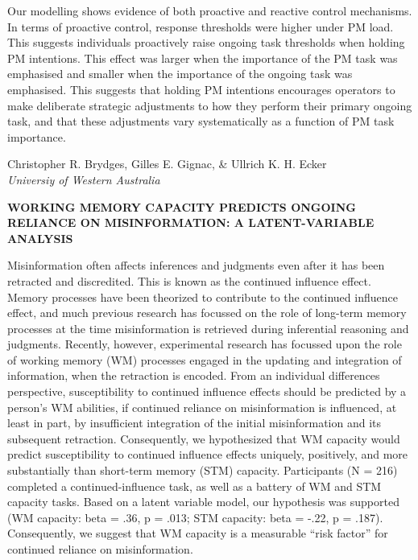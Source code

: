 \documentclass[]{article}
\begin{document}
Our modelling shows evidence of both proactive and reactive control
mechanisms. In terms of proactive control, response thresholds were
higher under PM load. This suggests individuals proactively raise
ongoing task thresholds when holding PM intentions. This effect was
larger when the importance of the PM task was emphasised and smaller
when the importance of the ongoing task was emphasised. This suggests
that holding PM intentions encourages operators to make deliberate
strategic adjustments to how they perform their primary ongoing task,
and that these adjustments vary systematically as a function of PM task
importance.\\
\pagebreak  

Christopher R. Brydges, Gilles E. Gignac, \& Ullrich K. H. Ecker\\
\emph{Universiy of Western Australia}

\textbf{WORKING MEMORY CAPACITY PREDICTS ONGOING RELIANCE ON
MISINFORMATION: A LATENT-VARIABLE ANALYSIS}

Misinformation often affects inferences and judgments even after it has
been retracted and discredited. This is known as the continued influence
effect. Memory processes have been theorized to contribute to the
continued influence effect, and much previous research has focussed on
the role of long-term memory processes at the time misinformation is
retrieved during inferential reasoning and judgments. Recently, however,
experimental research has focussed upon the role of working memory (WM)
processes engaged in the updating and integration of information, when
the retraction is encoded. From an individual differences perspective,
susceptibility to continued influence effects should be predicted by a
person's WM abilities, if continued reliance on misinformation is
influenced, at least in part, by insufficient integration of the initial
misinformation and its subsequent retraction. Consequently, we
hypothesized that WM capacity would predict susceptibility to continued
influence effects uniquely, positively, and more substantially than
short-term memory (STM) capacity. Participants (N = 216) completed a
continued-influence task, as well as a battery of WM and STM capacity
tasks. Based on a latent variable model, our hypothesis was supported
(WM capacity: beta = .36, p = .013; STM capacity: beta = -.22, p =
.187). Consequently, we suggest that WM capacity is a measurable ``risk
factor'' for continued reliance on misinformation.\\
\pagebreak  
\end{document}

